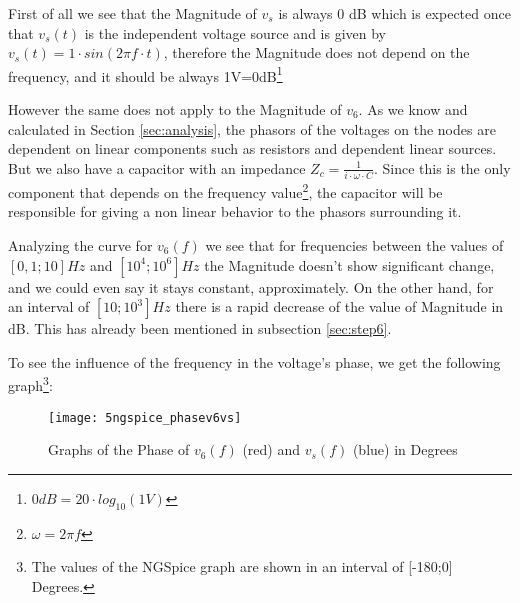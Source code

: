First of all we see that the Magnitude of $v_s$ is always 0 dB which is expected once that $v_s(t)$ is the independent voltage source and is given by $v_s(t)=1\cdot sin(2\pi f\cdot t)$, therefore the Magnitude does not depend on the frequency, and it should be always 1V=0dB\footnote{$0 dB= 20\cdot log_{10}(1V)$}\par 

However the same does not apply to the Magnitude of $v_6$. As we know and calculated in Section \ref{sec:analysis}, the phasors of the voltages on the nodes are dependent on linear components such as resistors and dependent linear sources. But we also have a capacitor with an impedance $Z_{c}=\frac{1}{i\cdot \omega \cdot C}$. Since this is the only component that depends on the frequency value\footnote{$\omega = 2\pi f$}, the capacitor will be responsible for giving a non linear behavior to the phasors surrounding it. \par 
Analyzing the curve for $v_6(f)$ we see that for frequencies between the values of $[0,1; 10]Hz$ and $[10^{4}; 10^{6}]Hz$ the Magnitude doesn't show significant change, and we could even say it stays constant, approximately. On the other hand, for an interval of $[10; 10^{3}]Hz$ there is a rapid decrease of the value of Magnitude in dB. This has already been mentioned in subsection \ref{sec:step6}.





To see the influence of the frequency in the voltage's phase, we get the following graph\footnote{The values of the NGSpice graph are shown in an interval of [-180;0] Degrees.}:

\FloatBarrier
\begin{figure}[h] \centering
	\texttt{[image: 5ngspice\_phasev6vs]}
	\caption{Graphs of the Phase of $v_6(f)$ (red) and $v_s(f)$ (blue) in Degrees}
	\label{fig:sim5.2}
\end{figure}
\FloatBarrier

